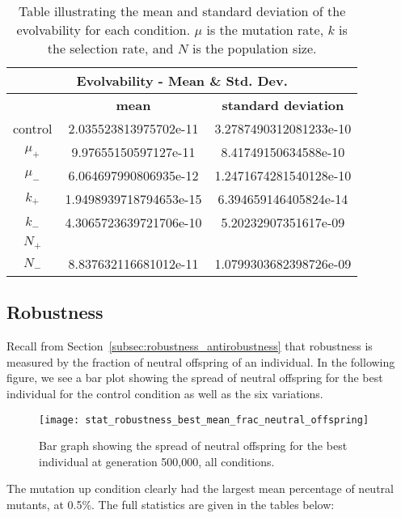 \begin{table}[H]
	\centering
	\begin{tabular}{| c | c | c |}
		\hline
		\multicolumn{3}{c}{\Large Evolvability - Mean \& Std. Dev.} \\
		\hline
		& \textbf{mean} & \textbf{standard deviation}\\
		\hline
		\hline
		control & 2.035523813975702e-11 & 3.2787490312081233e-10\\
		\hline
		$\mu_+$ & 9.97655150597127e-11 & 8.41749150634588e-10 \\
		\hline
		$\mu_-$ & 6.064697990806935e-12 & 1.2471674281540128e-10 \\
		\hline
		$k_+$ & 1.9498939718794653e-15 & 6.394659146405824e-14 \\
		\hline
		$k_-$ & 4.3065723639721706e-10 & 5.20232907351617e-09 \\
		\hline
		$N_+$ &  & \\
		\hline
		$N_-$ & 8.837632116681012e-11 &  1.0799303682398726e-09 \\
		\hline	 		 
	\end{tabular}
	\caption[Evolvability mean and standard deviation]{Table illustrating the mean and standard deviation of the evolvability for each condition. $\mu$ is the mutation rate, $k$ is the selection rate, and $N$ is the population size.}
	\label{table:mean_std_dev_evolvability}
\end{table}

\subsection{Robustness}
Recall from Section~\ref{subsec:robustness_antirobustness} that robustness is measured by the fraction of neutral offspring of an individual. In the following figure, we see a bar plot showing the spread of neutral offspring for the best individual for the control condition as well as the six variations. 

\begin{figure}[H]
	\centering
	\texttt{[image: stat\_robustness\_best\_mean\_frac\_neutral\_offspring]}
	\caption[Robustness bar graph]{Bar graph showing the spread of neutral offspring for the best individual at generation 500,000, all conditions.}
	\label{fig:mean_robustness_all_conditions}
\end{figure}
The mutation up condition clearly had the largest mean percentage of neutral mutants, at 0.5\%. The full statistics are given in the tables below:

